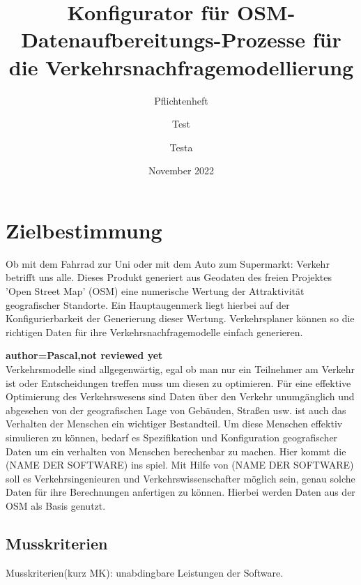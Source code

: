 \documentclass[parskip=full]{scrartcl} %
\title{Konfigurator für OSM-Datenaufbereitungs-Prozesse für die Verkehrsnachfragemodellierung}
\subtitle{Pflichtenheft}
\author[1]{Test}
\author[2]{Testa}
\date{November 2022}
\begin{document}
\maketitle
\newpage

\tableofcontents
\newpage




\section{Zielbestimmung}
Ob mit dem Fahrrad zur Uni oder mit dem Auto zum Supermarkt: Verkehr betrifft uns alle. Dieses Produkt generiert aus Geodaten des freien Projektes 'Open Street Map' (OSM) eine numerische Wertung der Attraktivität geografischer Standorte. Ein Hauptaugenmerk liegt hierbei auf der Konfigurierbarkeit der Generierung dieser Wertung. Verkehrsplaner können so die richtigen Daten für ihre Verkehrsnachfragemodelle einfach generieren.


\textbf{author=Pascal,not reviewed yet\\}
Verkehrsmodelle sind allgegenwärtig, egal ob man nur ein Teilnehmer am Verkehr ist oder Entscheidungen treffen muss um diesen zu optimieren.
Für eine effektive Optimierung des Verkehrswesens sind Daten über den Verkehr unumgänglich und abgesehen von der geografischen Lage von Gebäuden, Straßen usw. ist auch das Verhalten der Menschen ein wichtiger Bestandteil.
Um diese Menschen effektiv simulieren zu können, bedarf es Spezifikation und Konfiguration geografischer Daten um ein verhalten von Menschen berechenbar zu machen.
Hier kommt die (NAME DER SOFTWARE) ins spiel.
Mit Hilfe von (NAME DER SOFTWARE) soll es  Verkehrsingenieuren und Verkehrswissenschafter möglich sein, genau solche Daten für ihre Berechnungen anfertigen zu können.
Hierbei werden Daten aus der OSM als Basis genutzt.

\subsection{Musskriterien}
Musskriterien(kurz MK): unabdingbare Leistungen der Software.
\end{document}
